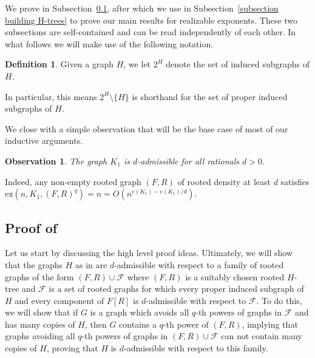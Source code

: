 \documentclass[12pt,letterpaper]{article}
\newtheorem{observation}[theorem]{Observation}
\theoremstyle{definition}
\newtheorem{definition}{Definition}
\newcommand{\pow}{q} %
\newcommand{\ex}{\mathrm{ex}}
\renewcommand{\c}[1]{\mathcal{#1}}
\newcommand{\sm}{\setminus}
\begin{document}
	We prove  in Subsection~\ref{subsection proof admissible}, after which we use  in Subsection~\ref{subsection building H-trees} to prove our main results for realizable exponents.  These two subsections are self-contained and can be read independently of each other.  In what follows we will make use of the following notation.
	
	\begin{definition}
		Given a graph $H$, we let $2^H$ denote the set of induced subgraphs of $H$. 
	\end{definition}
	
	In particular, this means $2^H\sm \{H\}$ is shorthand for the set of proper induced subgraphs of $H$. 
	
	We close with a simple observation that will be the base case of most of our inductive arguments. 
	
	\begin{observation}\label{observation K1 is easy}
		The graph $K_1$ is $d$-admissible for all rationals $d>0$.
	\end{observation}
	
	Indeed, any non-empty rooted graph $(F,R)$ of rooted density at least $d$ satisfies $\ex(n,K_1,(F,R)^\pow)=n=O(n^{v(K_1)-e(K_1)/d})$.
	
	
	
	
	\subsection{Proof of \texorpdfstring{}{Theorem 4.3}}\label{subsection proof admissible}
	
	Let us start by discussing the high level proof ideas.  Ultimately, we will show that the graphs $H$ as in  are $d$-admissible with respect to a family of rooted graphs of the form $(F,R)\cup \c{F}$ where $(F,R)$ is a suitably chosen rooted $H$-tree and $\c{F}$ is a set of rooted graphs for which every proper induced subgraph of $H$ and every component of $F[R]$ is $d$-admissible with respect to $\c{F}$.  To do this, we will show that if $G$ is a graph which avoids all $\pow$-th powers of graphs in $\c{F}$ and has many copies of $H$, then $G$ contains a $q$-th power of $(F,R)$, implying that graphs avoiding all $q$-th powers of graphs in $(F,R)\cup \c{F}$ can not contain many copies of $H$, proving that $H$ is $d$-admissible with respect to this family.
	
\end{document}
